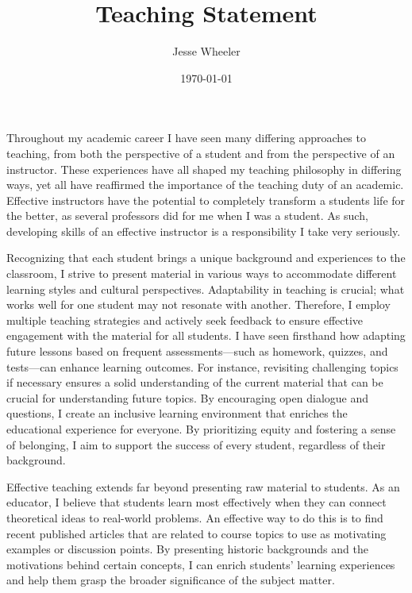 \documentclass{article}
\title{Teaching Statement}
\author{Jesse Wheeler}
\date{\today}
\begin{document}
\rule{0mm}{1mm}
\vspace{-20mm}


\vspace{1mm}

\rule{0mm}{1mm}

\vspace{3mm}
\rule{0mm}{1mm}

\vspace{4mm}


\noindent Throughout my academic career I have seen many differing approaches to teaching, from both the perspective of a student and from the perspective of an instructor.
These experiences have all shaped my teaching philosophy in differing ways, yet all have reaffirmed the importance of the teaching duty of an academic.
Effective instructors have the potential to completely transform a students life for the better, as several professors did for me when I was a student.
As such, developing skills of an effective instructor is a responsibility I take very seriously.

Recognizing that each student brings a unique background and experiences to the classroom, I strive to present material in various ways to accommodate different learning styles and cultural perspectives.
Adaptability in teaching is crucial; what works well for one student may not resonate with another.
Therefore, I employ multiple teaching strategies and actively seek feedback to ensure effective engagement with the material for all students.
I have seen firsthand how adapting future lessons based on frequent assessments—such as homework, quizzes, and tests—can enhance learning outcomes.
For instance, revisiting challenging topics if necessary ensures a solid understanding of the current material that can be crucial for understanding future topics.
By encouraging open dialogue and questions, I create an inclusive learning environment that enriches the educational experience for everyone.
By prioritizing equity and fostering a sense of belonging, I aim to support the success of every student, regardless of their background.

Effective teaching extends far beyond presenting raw material to students.
As an educator, I believe that students learn most effectively when they can connect theoretical ideas to real-world problems.
An effective way to do this is to find recent published articles that are related to course topics to use as motivating examples or discussion points.
By presenting historic backgrounds and the motivations behind certain concepts, I can enrich students' learning experiences and help them grasp the broader significance of the subject matter.
\end{document}
